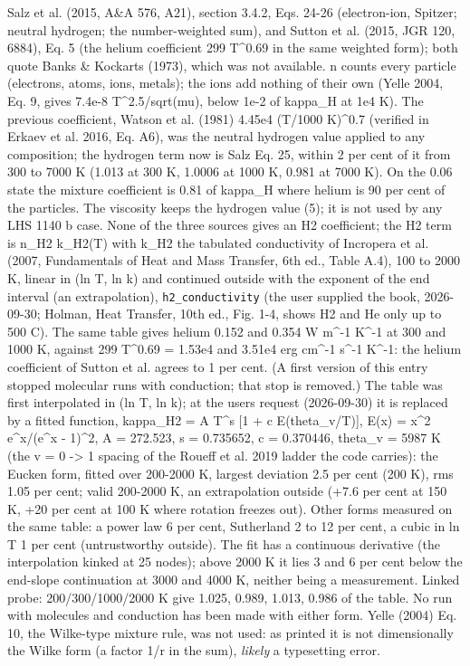 \documentclass[english,a4paper]{my_memo}
\begin{document}
Salz et al. (2015, A\&A 576, A21), section 3.4.2, Eqs. 24-26 (electron-ion,
Spitzer; neutral hydrogen; the number-weighted sum), and Sutton et al.
(2015, JGR 120, 6884), Eq. 5 (the helium coefficient 299 T\^{}0.69 in the same
weighted form); both quote Banks \& Kockarts (1973), which was not available.
n counts every particle (electrons, atoms, ions, metals); the ions add
nothing of their own (Yelle 2004, Eq. 9, gives 7.4e-8 T\^{}2.5/sqrt(mu), below
1e-2 of kappa\_H at 1e4 K). The previous coefficient, Watson et al. (1981)
4.45e4 (T/1000 K)\^{}0.7 (verified in Erkaev et al. 2016, Eq. A6), was the
neutral hydrogen value applied to any composition; the hydrogen term now is
Salz Eq. 25, within 2 per cent of it from 300 to 7000 K (1.013 at 300 K,
1.0006 at 1000 K, 0.981 at 7000 K). On the
0.06 state the mixture coefficient is 0.81 of kappa\_H where helium is 90
per cent of the particles. The viscosity keeps the hydrogen value (5); it
is not used by any LHS 1140 b case. None of the three sources gives an H2
coefficient; the H2 term is n\_H2 k\_H2(T) with k\_H2 the tabulated conductivity
of Incropera et al. (2007, Fundamentals of Heat and Mass Transfer, 6th ed.,
Table A.4), 100 to 2000 K, linear in (ln T, ln k) and continued outside with
the exponent of the end interval (an extrapolation), \texttt{h2\_conductivity}
(the user supplied the book, 2026-09-30; Holman, Heat Transfer, 10th ed.,
Fig. 1-4, shows H2 and He only up to 500 C). The same table gives helium
0.152 and 0.354 W m\^{}-1 K\^{}-1 at 300 and 1000 K, against 299 T\^{}0.69 = 1.53e4
and 3.51e4 erg cm\^{}-1 s\^{}-1 K\^{}-1: the helium coefficient of Sutton et al.
agrees to 1 per cent. (A first version of this entry stopped molecular runs
with conduction; that stop is removed.) The table was first interpolated in
(ln T, ln k); at the user\textquotesingle s request (2026-09-30) it is replaced by a fitted
function, kappa\_H2 = A T\^{}s {[}1 + c E(theta\_v/T){]}, E(x) = x\^{}2 e\^{}x/(e\^{}x - 1)\^{}2,
A = 272.523, s = 0.735652, c = 0.370446, theta\_v = 5987 K (the v = 0 -\textgreater{} 1
spacing of the Roueff et al. 2019 ladder the code carries): the Eucken form,
fitted over 200-2000 K, largest deviation 2.5 per cent (200 K), rms 1.05 per
cent; valid 200-2000 K, an extrapolation outside (+7.6 per cent at 150 K,
+20 per cent at 100 K where rotation freezes out). Other forms measured on
the same table: a power law 6 per cent, Sutherland 2 to 12 per cent, a cubic
in ln T 1 per cent (untrustworthy outside). The fit has a continuous
derivative (the interpolation kinked at 25 nodes); above 2000 K it lies 3
and 6 per cent below the end-slope continuation at 3000 and 4000 K, neither
being a measurement. Linked probe: 200/300/1000/2000 K give 1.025, 0.989,
1.013, 0.986 of the table. No run with molecules and conduction has been
made with either form. Yelle (2004) Eq. 10, the Wilke-type mixture rule,
was not used: as printed it is not dimensionally the Wilke form (a factor
1/r in the sum), \emph{likely} a typesetting error.
\end{document}
